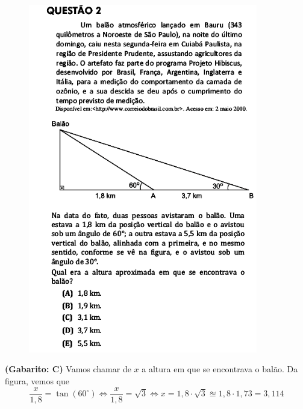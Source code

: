 \documentclass[a4paper]{article}
\begin{document}
\begin{figure}[H]
	\begin{center}
		\includegraphics[width=10cm]{L5Q2.png}
	\end{center}
\end{figure}
\par\textbf{(Gabarito: C)} Vamos chamar de $x$ a altura em que se encontrava o balão. Da figura, vemos que
\begin{equation*}
\frac{x}{1,8} = \tan(60^\circ) \iff \frac{x}{1,8} = \sqrt{3} \iff x = 1,8\cdot\sqrt{3} \approxeq 1,8\cdot 1,73 = 3,114
\end{equation*}
\end{document}
